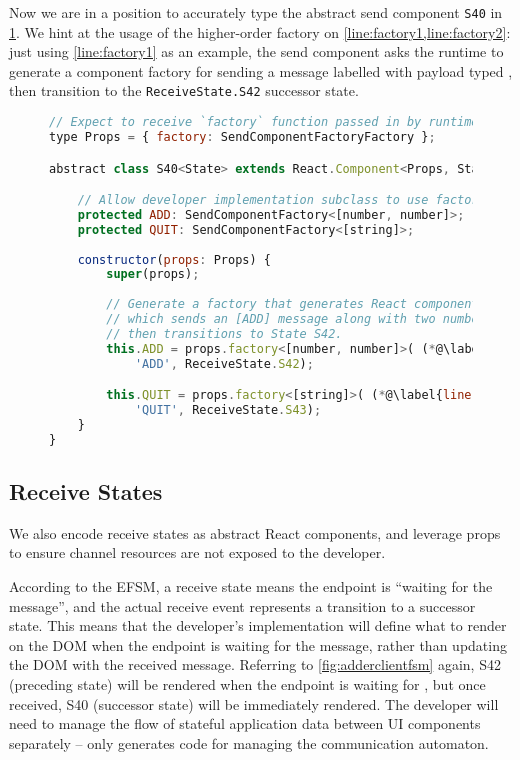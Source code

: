 Now we are in a position to accurately type the abstract
send component \texttt{S40} in \cref{lst:reactsendcomponent}.
We hint at the usage of the higher-order factory on
\cref{line:factory1,line:factory2}:
just using \cref{line:factory1} as an example,
the send component asks the runtime to generate a 
component factory for sending a message 
labelled 
with payload typed
,
then transition to the \texttt{ReceiveState.S42}
successor state.

\begin{figure}[!h]
\begin{lstlisting}[language=javascript,tabsize=2,title=S40.tsx]
// Expect to receive `factory` function passed in by runtime
type Props = { factory: SendComponentFactoryFactory };

abstract class S40<State> extends React.Component<Props, State> {

	// Allow developer implementation subclass to use factories
	protected ADD: SendComponentFactory<[number, number]>;
	protected QUIT: SendComponentFactory<[string]>;
	
	constructor(props: Props) {
		super(props);
		
		// Generate a factory that generates React components
		// which sends an [ADD] message along with two numbers,
		// then transitions to State S42.
		this.ADD = props.factory<[number, number]>( (*@\label{line:factory1}@*)
			'ADD', ReceiveState.S42);

		this.QUIT = props.factory<[string]>( (*@\label{line:factory2}@*)
			'QUIT', ReceiveState.S43);
	}
}
\end{lstlisting}
\label{lst:reactsendcomponent}
\end{figure}

\subsection{Receive States}

We also encode receive states as abstract React components,
and leverage props to ensure channel resources are not exposed
to the developer.

According to the EFSM, a receive state means
the endpoint is ``waiting for the message'',
and the actual receive event represents a transition
to a successor state.
This means that the developer's implementation will define
what to render on the DOM when the endpoint is waiting
for the message, rather than updating the DOM with the
received message.
Referring to \cref{fig:adderclientfsm} again,
S42 (preceding state) will be rendered when the 
endpoint is waiting for
, but once received, S40 (successor state) 
will be immediately
rendered. The developer will need to manage the flow
of stateful application data between UI components separately
--  only generates code for managing
the communication automaton.

